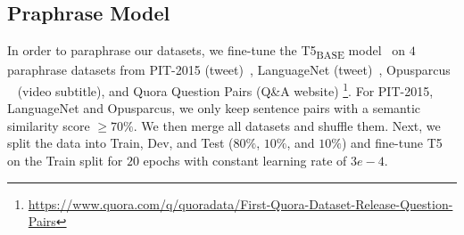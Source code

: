 \subsection{Praphrase Model}\label{sec:para} 
In order to paraphrase our datasets, we fine-tune the T5\textsubscript{BASE} model~\cite{raffel2020exploring} on $4$ paraphrase datasets from PIT-2015 (tweet)~\cite{xu2015semeval},  {LanguageNet} (tweet)~\cite{lan2017continuously}, {Opusparcus} ~\cite{creutz2018open}  (video subtitle), and Quora Question Pairs (Q\&A website) \footnote{\url{https://www.quora.com/q/quoradata/First-Quora-Dataset-Release-Question-Pairs}}. For PIT-2015, LanguageNet and Opusparcus, we only keep sentence pairs with a semantic similarity score $\geq 70\%$. We then merge all datasets and shuffle them. Next, we split the data into Train, Dev, and Test ($80\%$, $10\%$, and $10\%$) and fine-tune T5 on the Train split for $20$ epochs with constant learning rate of $3e-4$. 